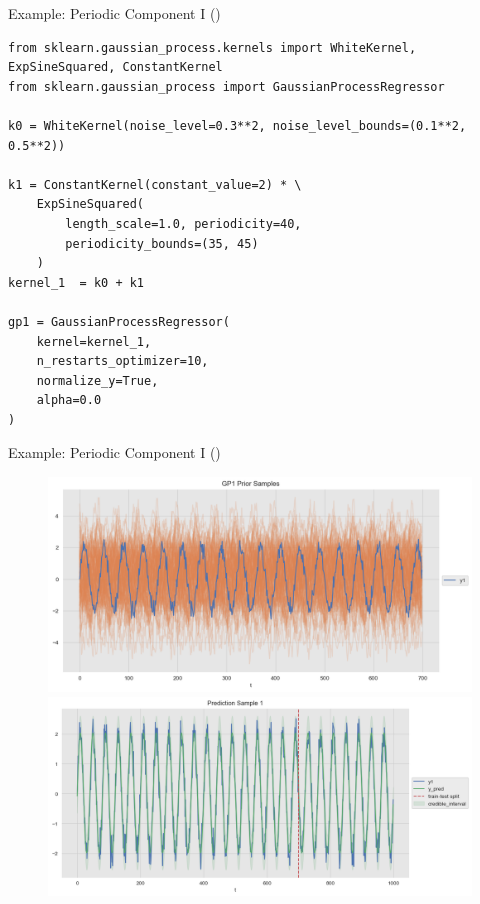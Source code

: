 \documentclass[10pt]{beamer}
\begin{document}
\begin{frame}[fragile]{Example: Periodic Component I (\cite{gaussian_process_time_series_2019})}{\cite[Section 1.7. Gaussian Processes]{scikitlearn}}
\begin{lstlisting}
from sklearn.gaussian_process.kernels import WhiteKernel, ExpSineSquared, ConstantKernel
from sklearn.gaussian_process import GaussianProcessRegressor

k0 = WhiteKernel(noise_level=0.3**2, noise_level_bounds=(0.1**2, 0.5**2))

k1 = ConstantKernel(constant_value=2) * \ 
    ExpSineSquared(
        length_scale=1.0, periodicity=40, 
        periodicity_bounds=(35, 45)
    )
kernel_1  = k0 + k1 

gp1 = GaussianProcessRegressor(
    kernel=kernel_1, 
    n_restarts_optimizer=10, 
    normalize_y=True,
    alpha=0.0
)
\end{lstlisting}
\end{frame}


\begin{frame}{Example: Periodic Component I (\cite{gaussian_process_time_series_2019})}{\cite[Section 1.7. Gaussian Processes]{scikitlearn}}
\begin{center}
\begin{figure}
\includegraphics[scale=0.30]{images/gaussian_process_time_series_files/gaussian_process_time_series_22_0.png}
\includegraphics[scale=0.30]{images/gaussian_process_time_series_files/gaussian_process_time_series_28_0.png}
\end{figure}
\end{center}
\end{frame}
\end{document}

